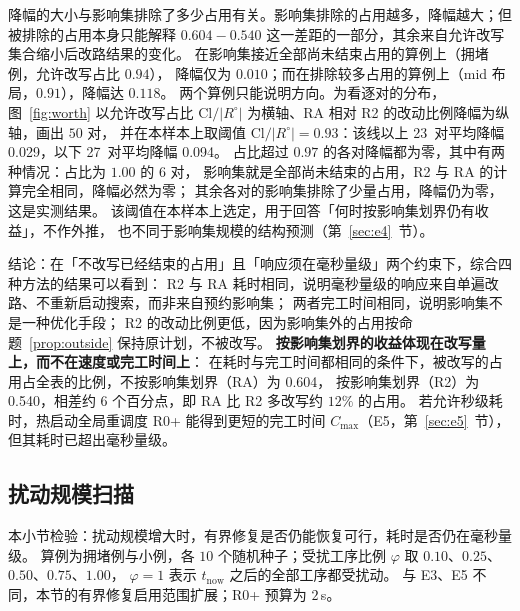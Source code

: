 \documentclass[manuscript,screen,review]{acmart}
\newcommand{\NSeeds}{10}
\newcommand{\NPairs}{50}
\newcommand{\ResFracCheapRtwo}{0.540}
\newcommand{\ResFracAllFuture}{0.604}
\newcommand{\ScaleCloAliveHi}{0.91}  %
\newcommand{\WorthThresh}{0.93}
\newcommand{\WorthLowN}{27}
\newcommand{\WorthLowMean}{0.094}
\newcommand{\WorthHighN}{23}
\newcommand{\WorthHighMean}{0.029}
\newcommand{\WorthVanish}{0.97}
\begin{document}
降幅的大小与影响集排除了多少占用有关。影响集排除的占用越多，降幅越大；但被排除的占用本身只能解释
\(\ResFracAllFuture-\ResFracCheapRtwo\) 这一差距的一部分，其余来自允许改写集合缩小后改路结果的变化。
在影响集接近全部尚未结束占用的算例上（拥堵例，允许改写占比 \(0.94\)），
降幅仅为 \(0.010\)；而在排除较多占用的算例上（mid 布局，\(0.91\)），降幅达 \(0.118\)。
两个算例只能说明方向。为看逐对的分布，图~\ref{fig:worth} 以允许改写占比
\(\mathrm{Cl}/|R^{\circ}|\) 为横轴、RA 相对 R2 的改动比例降幅为纵轴，画出 \(\NPairs\) 对，
并在本样本上取阈值 \(\mathrm{Cl}/|R^{\circ}|=\WorthThresh\)：该线以上 \WorthHighN\ 对平均降幅
\WorthHighMean，以下 \WorthLowN\ 对平均降幅 \WorthLowMean。
占比超过 \(\WorthVanish\) 的各对降幅都为零，其中有两种情况：占比为 \(1.00\) 的 \(6\) 对，
影响集就是全部尚未结束的占用，R2 与 RA 的计算完全相同，降幅必然为零；
其余各对的影响集排除了少量占用，降幅仍为零，这是实测结果。
该阈值在本样本上选定，用于回答「何时按影响集划界仍有收益」，不作外推，
也不同于影响集规模的结构预测（第~\ref{sec:e4}~节）。

结论：在「不改写已经结束的占用」且「响应须在毫秒量级」两个约束下，综合四种方法的结果可以看到：
R2 与 RA 耗时相同，说明毫秒量级的响应来自单遍改路、不重新启动搜索，而非来自预约影响集；
两者完工时间相同，说明影响集不是一种优化手段；
R2 的改动比例更低，因为影响集外的占用按命题~\ref{prop:outside} 保持原计划，不被改写。
\textbf{按影响集划界的收益体现在改写量上，而不在速度或完工时间上}：
在耗时与完工时间都相同的条件下，被改写的占用占全表的比例，不按影响集划界（RA）为 \ResFracAllFuture，
按影响集划界（R2）为 \ResFracCheapRtwo，相差约 \(6\) 个百分点，即 RA 比 R2 多改写约 \(12\%\) 的占用。
若允许秒级耗时，热启动全局重调度 R0+ 能得到更短的完工时间 \(C_{\max}\)（E5，第~\ref{sec:e5}~节），
但其耗时已超出毫秒量级。

\subsection{扰动规模扫描}
\label{sec:scale}

本小节检验：扰动规模增大时，有界修复是否仍能恢复可行，耗时是否仍在毫秒量级。
算例为拥堵例与小例，各 \(\NSeeds\) 个随机种子；受扰工序比例 \(\varphi\) 取 \(0.10\)、\(0.25\)、\(0.50\)、\(0.75\)、\(1.00\)，
\(\varphi=1\) 表示 \(t_{\mathrm{now}}\) 之后的全部工序都受扰动。
与 E3、E5 不同，本节的有界修复启用范围扩展；R0+ 预算为 \(2\)\,s。
\end{document}
